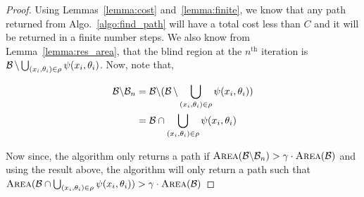\begin{proof}

    Using Lemmas~\ref{lemma:cost} and~\ref{lemma:finite}, we know that any path
    returned from Algo.~\ref{algo:find_path} will have a total cost less than
    $C$ and it will be returned in a finite number steps.  We also know from
    Lemma~\ref{lemma:res_area}, that the blind region at the $n^{\text{th}}$
    iteration is ${{\mathcal{B}}} \, \backslash
        \bigcup_{(x_i,
            \theta_i) \in
    \rho} \psi(x_i, \theta_i)$. Now, note that,

    \begin{align*}
        {{\mathcal{B}}} \backslash {{\mathcal{B}}}_n &= {{\mathcal{B}}} \backslash ({{\mathcal{B}}} \, \backslash
        \bigcup_{(x_i, \theta_i) \in \rho} \psi(x_i, \theta_i)) \\
        &= {{\mathcal{B}}} \cap
        \bigcup_{(x_i, \theta_i) \in \rho} \psi(x_i, \theta_i)
    \end{align*}

    Now since, the algorithm only returns a path if ${\textsc{Area}}({{\mathcal{B}}} \backslash
    {{\mathcal{B}}}_n) > \gamma \cdot {\textsc{Area}}({{\mathcal{B}}})$ and using the result above, the algorithm
    will only return a path such that ${\textsc{Area}}({{\mathcal{B}}} \cap
    \bigcup_{(x_i, \theta_i) \in \rho} \psi(x_i, \theta_i)) >
    \gamma \cdot {\textsc{Area}}({{\mathcal{B}}})$

\end{proof}
